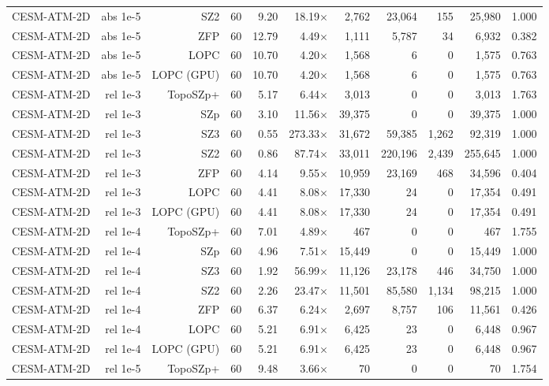 \begin{tabular}{lrrrrrrrrrr}
CESM-ATM-2D & abs 1e-5 & SZ2 & 60 & 9.20 & 18.19$\times$ & 2,762 & 23,064 & 155 & 25,980 & 1.000 \\
CESM-ATM-2D & abs 1e-5 & ZFP & 60 & 12.79 & 4.49$\times$ & 1,111 & 5,787 & 34 & 6,932 & 0.382 \\
CESM-ATM-2D & abs 1e-5 & LOPC & 60 & 10.70 & 4.20$\times$ & 1,568 & 6 & 0 & 1,575 & 0.763 \\
CESM-ATM-2D & abs 1e-5 & LOPC (GPU) & 60 & 10.70 & 4.20$\times$ & 1,568 & 6 & 0 & 1,575 & 0.763 \\
CESM-ATM-2D & rel 1e-3 & TopoSZp+ & 60 & 5.17 & 6.44$\times$ & 3,013 & 0 & 0 & 3,013 & 1.763 \\
CESM-ATM-2D & rel 1e-3 & SZp & 60 & 3.10 & 11.56$\times$ & 39,375 & 0 & 0 & 39,375 & 1.000 \\
CESM-ATM-2D & rel 1e-3 & SZ3 & 60 & 0.55 & 273.33$\times$ & 31,672 & 59,385 & 1,262 & 92,319 & 1.000 \\
CESM-ATM-2D & rel 1e-3 & SZ2 & 60 & 0.86 & 87.74$\times$ & 33,011 & 220,196 & 2,439 & 255,645 & 1.000 \\
CESM-ATM-2D & rel 1e-3 & ZFP & 60 & 4.14 & 9.55$\times$ & 10,959 & 23,169 & 468 & 34,596 & 0.404 \\
CESM-ATM-2D & rel 1e-3 & LOPC & 60 & 4.41 & 8.08$\times$ & 17,330 & 24 & 0 & 17,354 & 0.491 \\
CESM-ATM-2D & rel 1e-3 & LOPC (GPU) & 60 & 4.41 & 8.08$\times$ & 17,330 & 24 & 0 & 17,354 & 0.491 \\
CESM-ATM-2D & rel 1e-4 & TopoSZp+ & 60 & 7.01 & 4.89$\times$ & 467 & 0 & 0 & 467 & 1.755 \\
CESM-ATM-2D & rel 1e-4 & SZp & 60 & 4.96 & 7.51$\times$ & 15,449 & 0 & 0 & 15,449 & 1.000 \\
CESM-ATM-2D & rel 1e-4 & SZ3 & 60 & 1.92 & 56.99$\times$ & 11,126 & 23,178 & 446 & 34,750 & 1.000 \\
CESM-ATM-2D & rel 1e-4 & SZ2 & 60 & 2.26 & 23.47$\times$ & 11,501 & 85,580 & 1,134 & 98,215 & 1.000 \\
CESM-ATM-2D & rel 1e-4 & ZFP & 60 & 6.37 & 6.24$\times$ & 2,697 & 8,757 & 106 & 11,561 & 0.426 \\
CESM-ATM-2D & rel 1e-4 & LOPC & 60 & 5.21 & 6.91$\times$ & 6,425 & 23 & 0 & 6,448 & 0.967 \\
CESM-ATM-2D & rel 1e-4 & LOPC (GPU) & 60 & 5.21 & 6.91$\times$ & 6,425 & 23 & 0 & 6,448 & 0.967 \\
CESM-ATM-2D & rel 1e-5 & TopoSZp+ & 60 & 9.48 & 3.66$\times$ & 70 & 0 & 0 & 70 & 1.754 \\

\end{tabular}
